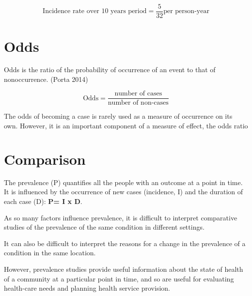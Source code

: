 \documentclass[
  letterpaper,
  DIV=11,
  numbers=noendperiod]{scrreprt}
\begin{document}
\[\text{Incidence rate over 10 years period} = \frac{5}{32} \text{per person-year}\]

\hypertarget{odds}{%
\section{Odds}\label{odds}}

Odds is the ratio of the probability of occurrence of an event to that
of nonoccurrence. (Porta 2014)

\[\text{Odds} = \frac{\text{number of cases}}{\text{number of non-cases}}\]

\begin{tcolorbox}[enhanced jigsaw, bottomtitle=1mm, breakable, colframe=quarto-callout-important-color-frame, leftrule=.75mm, opacityback=0, opacitybacktitle=0.6, left=2mm, colbacktitle=quarto-callout-important-color!10!white, coltitle=black, rightrule=.15mm, toptitle=1mm, colback=white, titlerule=0mm, title=\textcolor{quarto-callout-important-color}{\faExclamation}\hspace{0.5em}{Important}, arc=.35mm, bottomrule=.15mm, toprule=.15mm]

The odds of becoming a case is rarely used as a measure of occurrence on
its own. However, it is an important component of a measure of effect,
the odds ratio

\end{tcolorbox}

\hypertarget{comparison}{%
\section{Comparison}\label{comparison}}

The prevalence (P) quantifies all the people with an outcome at a point
in time. It is influenced by the occurrence of new cases (incidence, I)
and the duration of each case (D): \textbf{P= I x D}.

As so many factors influence prevalence, it is difficult to interpret
comparative studies of the prevalence of the same condition in different
settings.

It can also be difficult to interpret the reasons for a change in the
prevalence of a condition in the same location.

However, prevalence studies provide useful information about the state
of health of a community at a particular point in time, and so are
useful for evaluating health-care needs and planning health service
provision.
\end{document}
